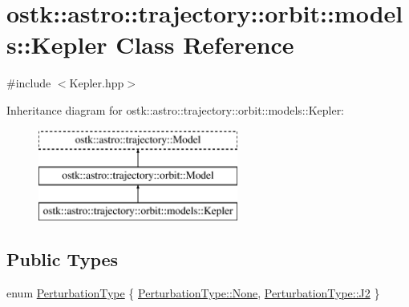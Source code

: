 \hypertarget{classostk_1_1astro_1_1trajectory_1_1orbit_1_1models_1_1_kepler}{}\section{ostk\+:\+:astro\+:\+:trajectory\+:\+:orbit\+:\+:models\+:\+:Kepler Class Reference}
\label{classostk_1_1astro_1_1trajectory_1_1orbit_1_1models_1_1_kepler}


{\ttfamily \#include $<$Kepler.\+hpp$>$}

Inheritance diagram for ostk\+:\+:astro\+:\+:trajectory\+:\+:orbit\+:\+:models\+:\+:Kepler\+:\begin{figure}[H]
\begin{center}
\leavevmode
\includegraphics[height=3.000000cm]{classostk_1_1astro_1_1trajectory_1_1orbit_1_1models_1_1_kepler}
\end{center}
\end{figure}
\subsection*{Public Types}
\begin{DoxyCompactItemize}
\item 
enum \hyperlink{classostk_1_1astro_1_1trajectory_1_1orbit_1_1models_1_1_kepler_a3750f9177ff06a1938826e2c2881d5a9}{Perturbation\+Type} \{ \hyperlink{classostk_1_1astro_1_1trajectory_1_1orbit_1_1models_1_1_kepler_a3750f9177ff06a1938826e2c2881d5a9a6adf97f83acf6453d4a6a4b1070f3754}{Perturbation\+Type\+::\+None}, 
\hyperlink{classostk_1_1astro_1_1trajectory_1_1orbit_1_1models_1_1_kepler_a3750f9177ff06a1938826e2c2881d5a9a7f132d501fb9863844ab51697900d494}{Perturbation\+Type\+::\+J2}
 \}
\end{DoxyCompactItemize}
